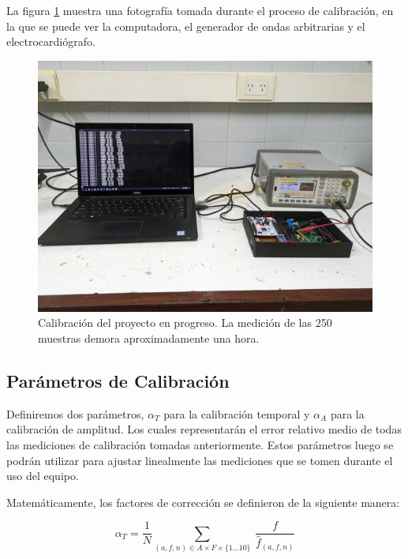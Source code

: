 \documentclass[conference]{IEEEtran}
\begin{document}
La figura \ref{fig:calibracion} muestra una fotografía tomada
durante el proceso de calibración, en la que se puede ver la computadora, el
generador de ondas arbitrarias y el electrocardiógrafo.

\begin{figure}[h]
    \centering
    \includegraphics[width=\linewidth]{figs/foto_calibracion.jpeg}
    \caption{Calibración del proyecto en progreso. La medición de las 250
    muestras demora aproximadamente una hora.}
    \label{fig:calibracion}

\end{figure}


\subsection{Parámetros de Calibración}

Definiremos dos parámetros, $\alpha_{T}$ para la calibración temporal y
$\alpha_{A}$ para la calibración de amplitud. Los cuales representarán
el error relativo medio de todas las mediciones de calibración tomadas
anteriormente.
Estos parámetros luego se podrán utilizar para ajustar linealmente las
mediciones que se tomen durante el uso del equipo.

Matemáticamente, los factores de corrección se definieron de la siguiente
manera: 


\begin{equation}
\alpha_{T} = \dfrac{1}{N} \sum_{(a,f,n) \in A \times F \times \{1...10 \}}
\nolimits ~ \frac{f}{\hat{f}_{(a,f,n)}}
\label{eqn:alpha_f}
\end{equation} 
\end{document}
